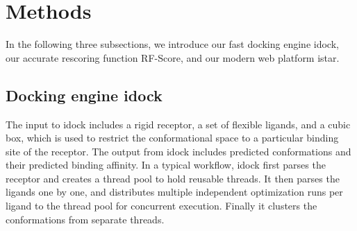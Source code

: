 \documentclass[10pt]{article}
\begin{document}
\section*{Methods}
In the following three subsections, we introduce our fast docking engine idock, our accurate rescoring function RF-Score, and our modern web platform istar.

\subsection*{Docking engine idock}
The input to idock includes a rigid receptor, a set of flexible ligands, and a cubic box, which is used to restrict the conformational space to a particular binding site of the receptor. The output from idock includes predicted conformations and their predicted binding affinity. In a typical workflow, idock first parses the receptor and creates a thread pool to hold reusable threads. It then parses the ligands one by one, and distributes multiple independent optimization runs per ligand to the thread pool for concurrent execution. Finally it clusters the conformations from separate threads.
\end{document}
